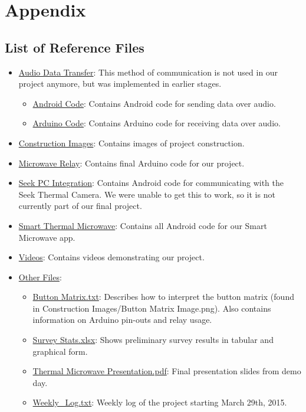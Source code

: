 \documentclass[10pt,journal,letterpaper,twocolumn]{IEEEtran}
\begin{document}



\section{Appendix}

\subsection*{List of Reference Files}
\begin{itemize}
	\item \underline{Audio Data Transfer}: This method of communication is not used in our project anymore, but was implemented in earlier stages.
    \begin{itemize}
    	\item \underline{Android Code}: Contains Android code for sending data over audio.
    	\item \underline{Arduino Code}: Contains Arduino code for receiving data over audio.
    \end{itemize}
    \item \underline{Construction Images}: Contains images of project construction.
    \item \underline{Microwave Relay}: Contains final Arduino code for our project.
    \item \underline{Seek PC Integration}: Contains Android code for communicating with the Seek Thermal Camera.  We were unable to get this to work, so it is not currently part of our final project.
    \item \underline{Smart Thermal Microwave}: Contains all Android code for our Smart Microwave app.
	\item \underline{Videos}: Contains videos demonstrating our project.
    \item \underline{Other Files}:
    \begin{itemize}
      \item \underline{Button Matrix.txt}: Describes how to interpret the button matrix (found in Construction Images/Button Matrix Image.png).  Also contains information on Arduino pin-outs and relay usage.
      \item \underline{Survey Stats.xlsx}: Shows preliminary survey results in tabular and graphical form.
      \item \underline{Thermal Microwave Presentation.pdf}: Final presentation slides from demo day.
      \item \underline{Weekly\_Log.txt}: Weekly log of the project starting March 29th, 2015.
    \end{itemize}
\end{itemize}
\end{document}

